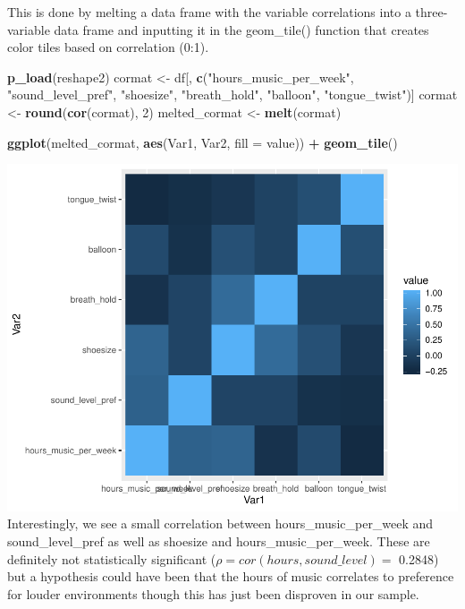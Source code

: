 \documentclass[]{article}
\newenvironment{Shaded}{\begin{snugshade}}{\end{snugshade}}
\newcommand{\DataTypeTok}[1]{\textcolor[rgb]{0.13,0.29,0.53}{#1}}
\newcommand{\DecValTok}[1]{\textcolor[rgb]{0.00,0.00,0.81}{#1}}
\newcommand{\KeywordTok}[1]{\textcolor[rgb]{0.13,0.29,0.53}{\textbf{#1}}}
\newcommand{\NormalTok}[1]{#1}
\newcommand{\OperatorTok}[1]{\textcolor[rgb]{0.81,0.36,0.00}{\textbf{#1}}}
\newcommand{\StringTok}[1]{\textcolor[rgb]{0.31,0.60,0.02}{#1}}
\begin{document}
This is done by melting a data frame with the variable correlations into a three-variable data frame and inputting it in the geom\_tile() function that creates color tiles based on correlation (0:1).

\begin{Shaded}
\begin{Highlighting}[]
\KeywordTok{p_load}\NormalTok{(reshape2)}
\NormalTok{cormat <-}\StringTok{ }\NormalTok{df[, }\KeywordTok{c}\NormalTok{(}\StringTok{"hours_music_per_week"}\NormalTok{, }\StringTok{"sound_level_pref"}\NormalTok{, }\StringTok{"shoesize"}\NormalTok{, }\StringTok{"breath_hold"}\NormalTok{, }
    \StringTok{"balloon"}\NormalTok{, }\StringTok{"tongue_twist"}\NormalTok{)]}
\NormalTok{cormat <-}\StringTok{ }\KeywordTok{round}\NormalTok{(}\KeywordTok{cor}\NormalTok{(cormat), }\DecValTok{2}\NormalTok{)}
\NormalTok{melted_cormat <-}\StringTok{ }\KeywordTok{melt}\NormalTok{(cormat)}

\KeywordTok{ggplot}\NormalTok{(melted_cormat, }\KeywordTok{aes}\NormalTok{(Var1, Var2, }\DataTypeTok{fill =}\NormalTok{ value)) }\OperatorTok{+}\StringTok{ }\KeywordTok{geom_tile}\NormalTok{()}
\end{Highlighting}
\end{Shaded}

\includegraphics{Personality-Data-Analysis-Portfolio-1_files/figure-latex/unnamed-chunk-15-1.pdf}
Interestingly, we see a small correlation between hours\_music\_per\_week and sound\_level\_pref as well as shoesize and hours\_music\_per\_week. These are definitely not statistically significant (\(\rho=cor(hours, sound\_level)=\) 0.2848) but a hypothesis could have been that the hours of music correlates to preference for louder environments though this has just been disproven in our sample.
\end{document}
